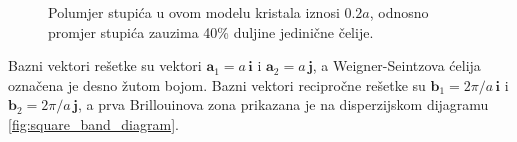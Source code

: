 \documentclass[utf8, seminar, numeric]{fer}
\begin{document}
\begin{figure}[ht]
\centering
    \qquad
	\caption{Polumjer stupića u ovom modelu kristala iznosi ${0.2 a}$, odnosno
	promjer stupića zauzima 40\% duljine jedinične čelije.}
	\label{fig:square_lattice}
\end{figure}

Bazni vektori rešetke su vektori ${\mathbf{a}_1 = a \, \mathbf{i}}$ i
${\mathbf{a}_2= a \, \mathbf{j}}$, a Weigner-Seintzova ćelija označena je
desno žutom bojom. Bazni vektori recipročne rešetke su
${\mathbf{b}_1 = 2 \pi/a \, \mathbf{i}}$ i
${\mathbf{b}_2 = 2 \pi/a \, \mathbf{j}}$, a prva Brillouinova zona prikazana
je na disperzijskom dijagramu \ref{fig:square_band_diagram}.
\end{document}
